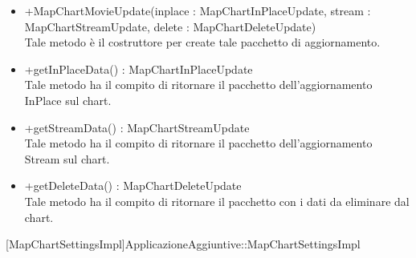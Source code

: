 \begin{itemize}
\begin{itemize}
					\item[\ding{111}] {{+MapChartMovieUpdate(inplace : MapChartInPlaceUpdate, stream : MapChartStreamUpdate, delete : MapChartDeleteUpdate)}} \\ [1mm] Tale metodo è il costruttore per create tale pacchetto di aggiornamento.
					\item[\ding{111}] {{+getInPlaceData() : MapChartInPlaceUpdate}} \\ [1mm] Tale metodo ha il compito di ritornare il pacchetto dell'aggiornamento InPlace sul chart.
					\item[\ding{111}] {{+getStreamData() : MapChartStreamUpdate}} \\ [1mm] Tale metodo ha il compito di ritornare il pacchetto dell'aggiornamento Stream sul chart.
					\item[\ding{111}] {{+getDeleteData() : MapChartDeleteUpdate}} \\ [1mm] Tale metodo ha il compito di ritornare il pacchetto con i dati da eliminare dal chart.
				\end{itemize}
		
			\end{itemize}
	
			[MapChartSettingsImpl]{ApplicazioneAggiuntive::MapChartSettingsImpl}
			

	
